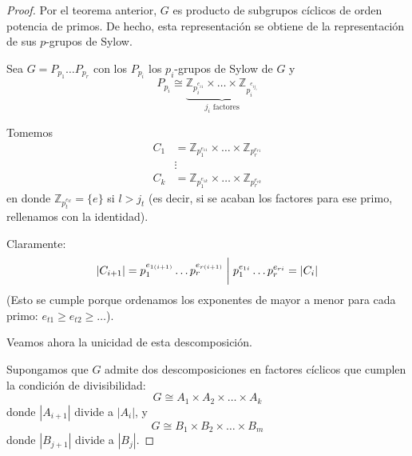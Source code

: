 

\begin{proof}
Por el teorema anterior, $G$ es producto de subgrupos cíclicos de orden potencia de primos.
De hecho, esta representación se obtiene de la representación de sus $p$-grupos de Sylow.

Sea $G = P_{p_1} \dots P_{p_r}$ con los $P_{p_i}$ los $p_i$-grupos de Sylow de $G$ y
\begin{equation*}
P_{p_i} \cong \underbrace{\mathbb{Z}_{p_i^{e_{i1}}} \times \dots \times \mathbb{Z}_{p_i^{e_{ij_i}}}}_{j_i \text{ factores}}
\end{equation*}

Tomemos
\begin{align*}
C_1 &= \mathbb{Z}_{p_1^{e_{11}}} \times \dots \times \mathbb{Z}_{p_r^{e_{r1}}} \\
&\vdots \\
C_k &= \mathbb{Z}_{p_1^{e_{1k}}} \times \dots \times \mathbb{Z}_{p_r^{e_{rk}}}
\end{align*}
en donde $\mathbb{Z}_{p_t^{e_{tl}}} = \{e\}$ si $l > j_t$ (es decir, si se acaban los factores para ese primo, rellenamos con la identidad).

Claramente:
\begin{equation*}
|C_{i+1}| = p_1^{e_{1(i+1)}} \dots p_r^{e_{r(i+1)}} \biggm| p_1^{e_{1i}} \dots p_r^{e_{ri}} = |C_i|
\end{equation*}
(Esto se cumple porque ordenamos los exponentes de mayor a menor para cada primo: $e_{t1} \ge e_{t2} \ge \dots$).

Veamos ahora la unicidad de esta descomposición.

Supongamos que $G$ admite dos descomposiciones en factores cíclicos que cumplen la condición de divisibilidad:
\begin{equation*}
G \cong A_1 \times A_2 \times \dots \times A_k
\end{equation*}
donde $|A_{i+1}|$ divide a $|A_i|$, y
\begin{equation*}
G \cong B_1 \times B_2 \times \dots \times B_m
\end{equation*}
donde $|B_{j+1}|$ divide a $|B_j|$.


\end{proof}
